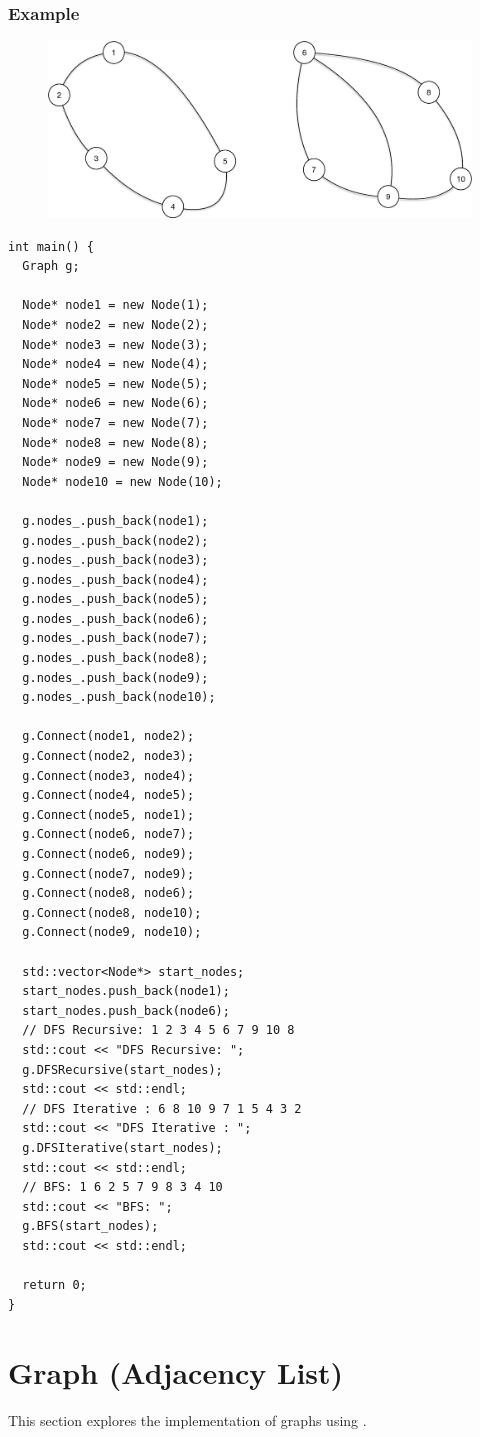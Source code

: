 \subsubsection{Example}
\begin{figure}[H]
\centering
\includegraphics[width=0.7\linewidth]{images/undirected_graph_eg}
\end{figure}
\begin{lstlisting}
int main() {
  Graph g;

  Node* node1 = new Node(1);
  Node* node2 = new Node(2);
  Node* node3 = new Node(3);
  Node* node4 = new Node(4);
  Node* node5 = new Node(5);
  Node* node6 = new Node(6);
  Node* node7 = new Node(7);
  Node* node8 = new Node(8);
  Node* node9 = new Node(9);
  Node* node10 = new Node(10);

  g.nodes_.push_back(node1);
  g.nodes_.push_back(node2);
  g.nodes_.push_back(node3);
  g.nodes_.push_back(node4);
  g.nodes_.push_back(node5);
  g.nodes_.push_back(node6);
  g.nodes_.push_back(node7);
  g.nodes_.push_back(node8);
  g.nodes_.push_back(node9);
  g.nodes_.push_back(node10);

  g.Connect(node1, node2);
  g.Connect(node2, node3);
  g.Connect(node3, node4);
  g.Connect(node4, node5);
  g.Connect(node5, node1);
  g.Connect(node6, node7);
  g.Connect(node6, node9);
  g.Connect(node7, node9);
  g.Connect(node8, node6);
  g.Connect(node8, node10);
  g.Connect(node9, node10);

  std::vector<Node*> start_nodes;
  start_nodes.push_back(node1);
  start_nodes.push_back(node6);
  // DFS Recursive: 1 2 3 4 5 6 7 9 10 8
  std::cout << "DFS Recursive: ";
  g.DFSRecursive(start_nodes);
  std::cout << std::endl;
  // DFS Iterative : 6 8 10 9 7 1 5 4 3 2
  std::cout << "DFS Iterative : ";
  g.DFSIterative(start_nodes);
  std::cout << std::endl;
  // BFS: 1 6 2 5 7 9 8 3 4 10
  std::cout << "BFS: ";
  g.BFS(start_nodes);
  std::cout << std::endl;

  return 0;
}
\end{lstlisting}

\section{Graph (Adjacency List)}
This section explores the implementation of graphs using {\color{blue}{adjacency list}}.\\

